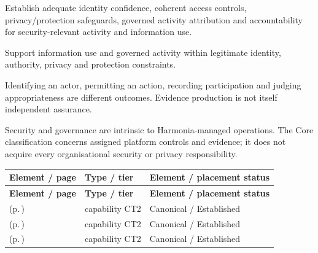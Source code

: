 
Establish adequate identity confidence, coherent access controls, privacy/\allowbreak{}protection safeguards, governed activity attribution and accountability for security-relevant activity and information use.



Support information use and governed activity within legitimate identity, authority, privacy and protection constraints.



Identifying an actor, permitting an action, recording participation and judging appropriateness are different outcomes. Evidence production is not itself independent assurance.



Security and governance are intrinsic to Harmonia-managed operations. The Core classification concerns assigned platform controls and evidence; it does not acquire every organisational security or privacy responsibility.


\begingroup\small\setlength{\TableWidth}{\dimexpr\linewidth-6\tabcolsep-4\arrayrulewidth\relax}
\begin{longtable}{|>{\raggedright\arraybackslash}p{0.52\TableWidth}|>{\raggedright\arraybackslash}p{0.2\TableWidth}|>{\raggedright\arraybackslash}p{0.28\TableWidth}|}
\hline\rowcolor{TableHead}\textbf{Element / page} & \textbf{Type / tier} & \textbf{Element / placement status}\\\hline\endfirsthead
\hline\rowcolor{TableHead}\textbf{Element / page} & \textbf{Type / tier} & \textbf{Element / placement status}\\\hline\endhead
\hline\endfoot
\nameref{cap:bc-digital-identity-access-governance} (p.\,\pageref{cap:bc-digital-identity-access-governance}) & capability CT2 & Canonical / Established\\\hline
\nameref{cap:bc-health-information-protection} (p.\,\pageref{cap:bc-health-information-protection}) & capability CT2 & Canonical / Established\\\hline
\nameref{cap:bc-digital-accountability-trust} (p.\,\pageref{cap:bc-digital-accountability-trust}) & capability CT2 & Canonical / Established\\\hline
\end{longtable}\endgroup


